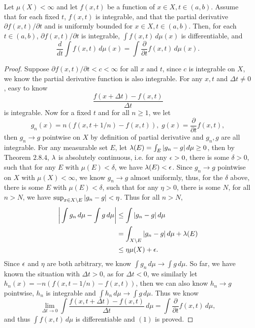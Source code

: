 \begin{pro}%
	Let $\mu(X)<\infty$ and let $f(x,t)$ be a function of $x\in X,t\in(a,b)$. Assume that for each fixed $t$, $f(x,t)$ is integrable, and that the partial derivative $\partial f(x,t)/\partial t$ and is uniformly bounded for $x\in X,t\in(a,b)$. Then, for each $t\in(a,b)$, $\partial f(x,t)/\partial t$ is integrable, $\int f(x,t)\,d\mu(x)$ is differentiable, and
	\[\frac{d}{dt}\int f(x,t)\,d\mu(x)=\int \frac{\partial}{\partial t} f(x,t)\,d\mu(x).\tag{1}\]
\end{pro}
\begin{proof}
	Suppose $\partial f(x,t)/\partial t<c<\infty$ for all $x$ and $t$, since $c$ is integrable on $X$, we know the partial derivative function is also integrable. For any $x,t$ and $\Delta t\neq 0$, easy to know
	\[\frac{f(x+\Delta t)-f(x,t)}{\Delta t}\]
	is integrable. Now for a fixed $t$ and for all $n\geq 1$, we let
	\[g_n(x)=n(f(x,t+1/n)-f(x,t)),\;g(x)=\frac{\partial}{\partial t} f(x,t),\]
	then $g_n\to g$ pointwise on $X$ by definition of partial derivative and $g_n,g$ are all integrable. For any measurable set $E$, let $\lambda(E)=\int_E |g_n-g|\,d\mu\geq 0$, then by Theorem $2.8.4$, $\lambda$ is absolutely continuous, i.e.
	for any $\epsilon>0$, there is some $\delta>0$, such that for any $E$ with $\mu(E)<\delta$, we have $\lambda(E)<\epsilon$.
	Since $g_n\to g$ pointwise on $X$ with $\mu(X)<\infty$, we know $g_n\to g$ almost uniformly, thus, for the $\delta$ above, there is some $E$ with $\mu(E)<\delta$, such that for any $\eta>0$, there is some $N$, for all $n>N$, we have
	$\sup_{x\in X\backslash E}|g_n-g|<\eta$. Thus for all $n>N$,
	\begin{align*}
		\bigg|\int g_n\,d\mu-\int g\,d\mu\bigg|
		&\leq \int |g_n-g|\,d\mu\\
		&=\int_{X\backslash E} |g_n-g|\,d\mu+\lambda(E)\\
		&\leq \eta\mu(X)+\epsilon.
	\end{align*}
	Since $\epsilon$ and $\eta$ are both arbitrary, we know $\int g_n\,d\mu\to \int g\,d\mu$. So far, we have known the situation with $\Delta t>0$, as for $\Delta t<0$, we similarly let $h_n(x)=-n(f(x,t-1/n)-f(x,t))$, then we can also know $h_n\to g$ pointwise, $h_n$ is integrable and $\int h_n\,d\mu\to\int g\,d\mu$. Thus we know
	\[\lim_{\Delta t\to 0} \int \frac{f(x,t+\Delta t)-f(x,t)}{\Delta t}\,d\mu=\int \frac{\partial}{\partial t} f(x,t)\,d\mu,\]
	and thus $\int f(x,t)\,d\mu$ is differentiable and $(1)$ is proved.
\end{proof}


